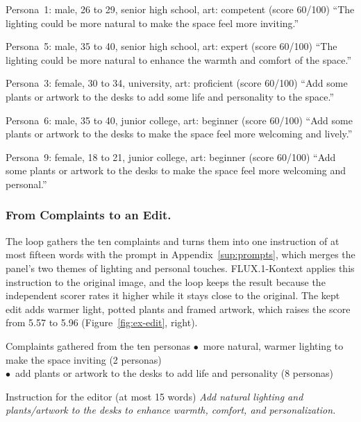\documentclass[runningheads]{llncs}
\begin{document}
\begin{personabox}{Persona~1: male, 26 to 29, senior high school, art: competent \quad(score 60/100)}
``The lighting could be more natural to make the space feel more inviting.''
\end{personabox}
\begin{personabox}{Persona~5: male, 35 to 40, senior high school, art: expert \quad(score 60/100)}
``The lighting could be more natural to enhance the warmth and comfort of the space.''
\end{personabox}
\begin{personabox}{Persona~3: female, 30 to 34, university, art: proficient \quad(score 60/100)}
``Add some plants or artwork to the desks to add some life and personality to the space.''
\end{personabox}
\begin{personabox}{Persona~6: male, 35 to 40, junior college, art: beginner \quad(score 60/100)}
``Add some plants or artwork to the desks to make the space feel more welcoming and lively.''
\end{personabox}
\begin{personabox}{Persona~9: female, 18 to 21, junior college, art: beginner \quad(score 60/100)}
``Add some plants or artwork to the desks to make the space feel more welcoming and personal.''
\end{personabox}

\subsubsection{From Complaints to an Edit.} The loop gathers the ten complaints and turns them into one instruction of at most fifteen words with the prompt in Appendix~\ref{sup:prompts}, which merges the panel's two themes of lighting and personal touches. FLUX.1-Kontext applies this instruction to the original image, and the loop keeps the result because the independent scorer rates it higher while it stays close to the original. The kept edit adds warmer light, potted plants and framed artwork, which raises the score from 5.57 to 5.96 (Figure~\ref{fig:ex-edit}, right).

\begin{instrbox}{Complaints gathered from the ten personas}
$\bullet$~more natural, warmer lighting to make the space inviting \hfill (2 personas)\\
$\bullet$~add plants or artwork to the desks to add life and personality \hfill (8 personas)
\end{instrbox}
\begin{instrbox}{Instruction for the editor (at most 15 words)}
\itshape
Add natural lighting and plants/artwork to the desks to enhance warmth, comfort, and personalization.
\end{instrbox}
\end{document}

